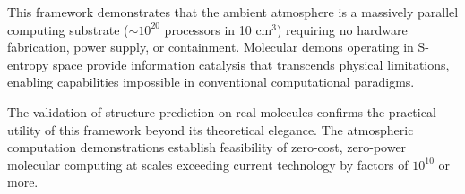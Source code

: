 \documentclass[11pt]{article}
\begin{document}
This framework demonstrates that the ambient atmosphere is a massively parallel computing substrate ($\sim$$10^{20}$ processors in 10 cm$^3$) requiring no hardware fabrication, power supply, or containment. Molecular demons operating in S-entropy space provide information catalysis that transcends physical limitations, enabling capabilities impossible in conventional computational paradigms.

The validation of structure prediction on real molecules confirms the practical utility of this framework beyond its theoretical elegance. The atmospheric computation demonstrations establish feasibility of zero-cost, zero-power molecular computing at scales exceeding current technology by factors of $10^{10}$ or more.



\end{document}
